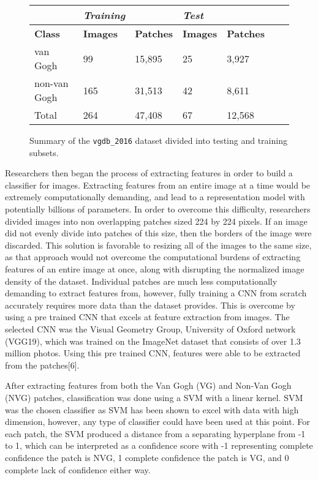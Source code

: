 \documentclass{article}
\begin{document}
\begin{figure}[H]
\begin{adjustbox}{center}
  
  \centering
  
    \begin{tabular}{@{}lllllll@{}} 
    
    \toprule
&\textit{\textbf{Training}} && \textit{\textbf{Test}}\\
    \midrule
\textbf{Class} & \textbf{Images} & \textbf{Patches} & \textbf{Images} & \textbf{Patches} \\
\midrule
van Gogh & 99 & 15,895 & 25 & 3,927\\
non-van Gogh & 165 & 31,513 & 42 & 8,611\\
Total & 264 & 47,408 & 67 & 12,568\\
    \bottomrule
    \end{tabular}%
  \label{table1}
\end{adjustbox}
\caption{Summary of the \texttt{vgdb\_2016} dataset divided into testing and training subsets.}
\end{figure}
Researchers then began the process of extracting features in order to build a classifier for images. Extracting features from an entire image at a time would be extremely computationally demanding, and lead to a representation model with potentially billions of parameters. In order to overcome this difficulty, researchers divided images into non overlapping patches sized 224 by 224 pixels. If an image did not evenly divide into patches of this size, then the borders of the image were discarded. This solution is favorable to resizing all of the images to the same size, as that approach would not overcome the computational burdens of extracting features of an entire image at once, along with disrupting the normalized image density of the dataset. Individual patches are much less computationally demanding to extract features from, however, fully training a CNN from scratch accurately requires more data than the dataset provides. This is overcome by using a pre trained CNN that excels at feature extraction from images. The selected CNN was the Visual Geometry Group, University of Oxford network (VGG19), which was trained on the ImageNet dataset that consists of over 1.3 million photos. Using this pre trained CNN, features were able to be extracted from the patches[6]. 

After extracting features from both the Van Gogh (VG) and Non-Van Gogh (NVG) patches, classification was done using a SVM with a linear kernel. SVM was the chosen classifier as SVM has been shown to excel with data with high dimension, however, any type of classifier could have been used at this point. For each patch, the SVM produced a distance from a separating hyperplane from -1 to 1, which can be interpreted as a confidence score with -1 representing complete confidence the patch is NVG, 1 complete confidence the patch is VG, and 0 complete lack of confidence either way. 
\end{document}

